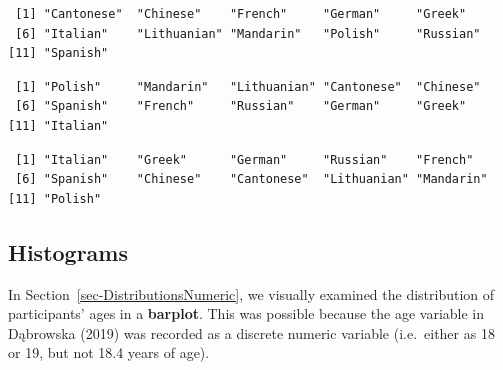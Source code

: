 \documentclass[
  letterpaper,
  DIV=11,
  numbers=noendperiod]{scrreprt}
\newenvironment{Shaded}{\begin{snugshade}}{\end{snugshade}}
\newcommand{\FunctionTok}[1]{\textcolor[rgb]{0.28,0.35,0.67}{#1}}
\newcommand{\NormalTok}[1]{\textcolor[rgb]{0.00,0.23,0.31}{#1}}
\newcommand{\SpecialCharTok}[1]{\textcolor[rgb]{0.37,0.37,0.37}{#1}}
\begin{document}
\begin{Shaded}
\end{Shaded}

\begin{verbatim}
 [1] "Cantonese"  "Chinese"    "French"     "German"     "Greek"     
 [6] "Italian"    "Lithuanian" "Mandarin"   "Polish"     "Russian"   
[11] "Spanish"   
\end{verbatim}

\begin{Shaded}
\end{Shaded}

\begin{verbatim}
 [1] "Polish"     "Mandarin"   "Lithuanian" "Cantonese"  "Chinese"   
 [6] "Spanish"    "French"     "Russian"    "German"     "Greek"     
[11] "Italian"   
\end{verbatim}

\begin{Shaded}
\end{Shaded}

\begin{verbatim}
 [1] "Italian"    "Greek"      "German"     "Russian"    "French"    
 [6] "Spanish"    "Chinese"    "Cantonese"  "Lithuanian" "Mandarin"  
[11] "Polish"    
\end{verbatim}

\subsection{Histograms}\label{sec-histograms}

In Section~\ref{sec-DistributionsNumeric}, we visually examined the
distribution of participants' ages in a \textbf{barplot}. This was
possible because the age variable in Dąbrowska (2019) was recorded as a
discrete numeric variable (i.e.~either as 18 or 19, but not 18.4 years
of age).
\end{document}

